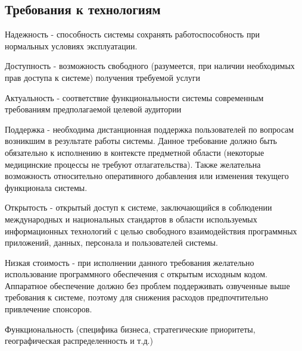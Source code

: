 \subsection{Требования к технологиям}
Надежность - способность системы сохранять работоспособность при нормальных
условиях эксплуатации.

Доступность - возможность свободного (разумеется, при наличии необходимых прав
доступа к системе) получения требуемой услуги 

Актуальность - соответствие
функциональности системы современным требованиям предполагаемой целевой
аудитории 

Поддержка - необходима дистанционная поддержка пользователей по
вопросам возникшим в результате работы системы. Данное требование должно быть
обязательно к исполнению в контексте предметной области (некоторые медицинские
процессы не требуют отлагательства). Также желательна возможность относительно
оперативного добавления или изменения текущего функционала системы.

Открытость - открытый доступ к системе, заключающийся в соблюдении
международных и национальных стандартов в области используемых информационных
технологий с целью свободного взаимодействия  программных приложений, данных,
персонала и пользователей системы.

Низкая стоимость - при исполнении данного требования желательно использование
программного обеспечения с открытым исходным кодом. Аппаратное обеспечение
должно без проблем поддерживать озвученные выше требования к системе, поэтому
для снижения расходов предпочтительно привлечение спонсоров.

Функциональность (специфика бизнеса, стратегические приоритеты, географическая
распределенность и т.д.)
